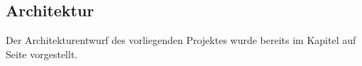 \subsection{Architektur}
\label{sec:Architektur}

Der Architekturentwurf des vorliegenden Projektes wurde bereits im Kapitel  auf Seite \pageref{sec:Architekturgrundlagen} vorgestellt.